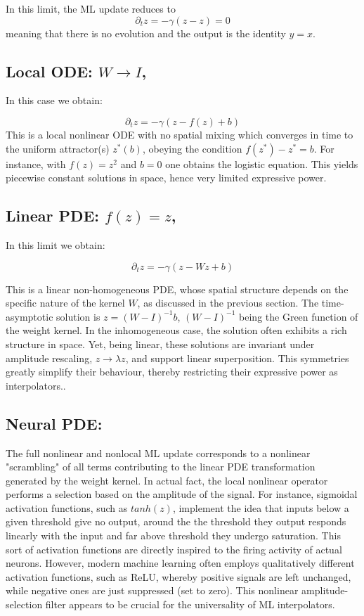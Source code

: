 \documentclass[15pt]{article}
\begin{document}
In this limit, the ML update reduces to 
$$
\partial_t z = -\gamma(z-z)=0
$$ 
meaning that there is no evolution and the output is the identity $y=x$.

\subsection{Local ODE:  $W \to I$,} 

In this case we obtain:

$$
\partial_t z = -\gamma (z-f(z)+b)
$$ 
This is a local nonlinear ODE with no spatial mixing which converges
in time to the uniform attractor(s) $z^*(b)$, obeying the condition
$f(z^*)-z^* = b$. For instance, with $f(z)=z^2$ and $b=0$ one obtains  
the logistic equation. 
This yields piecewise constant solutions in space, hence very limited
expressive power.  

\subsection{Linear PDE: $f(z)=z$,} 

In this limit we obtain:

$$
\partial_t z = -\gamma (z-Wz+b)
$$ 

This is a linear non-homogeneous PDE, whose spatial structure
depends on the specific nature of the kernel $W$, as discussed in
the previous section. 
The time-asymptotic solution is $z=(W-I)^{-1} b$, $(W-I)^{-1}$ being
the Green function of the weight kernel.
In the inhomogeneous case, the solution often exhibits a rich
structure in space. Yet, being linear, these solutions are invariant
under amplitude rescaling, $z \to \lambda z$, and support linear
superposition. This symmetries greatly simplify their behaviour, thereby
restricting their expressive power as interpolators..
    
\subsection{Neural PDE:}

The full nonlinear and nonlocal ML update corresponds to
a nonlinear "scrambling" of all terms contributing to the linear PDE 
transformation generated by the weight kernel.
In actual fact, the local nonlinear operator performs a selection
based on the amplitude of the signal. For instance, sigmoidal activation
functions, such as $tanh(z)$, implement the idea that inputs below
a given threshold give no output, around the the threshold they output
responds linearly with the input and far above threshold they undergo saturation.
This sort of activation functions are directly inspired to the 
firing activity of actual neurons.
However, modern machine learning often employs qualitatively different
activation functions, such as ReLU, whereby positive signals are left unchanged,
while negative ones are just suppressed (set to zero).      
This nonlinear amplitude-selection filter appears to be crucial 
for the universality of ML interpolators.
\end{document}
